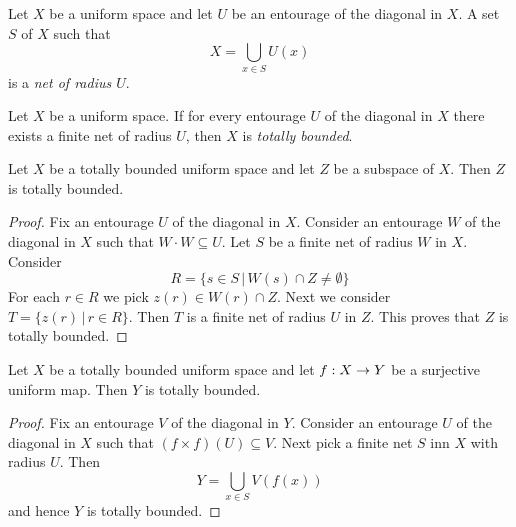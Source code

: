 \begin{definition}
	Let $X$ be a uniform space and let $U$ be an entourage of the diagonal in $X$. A set $S$ of $X$ such that
	$$X = \bigcup_{x\in S}U(x)$$
	is a \textit{net of radius $U$}.
\end{definition}

\begin{definition}
	Let $X$ be a uniform space. If for every entourage $U$ of the diagonal in $X$ there exists a finite net of radius $U$, then $X$ is \textit{totally bounded}.
\end{definition}

\begin{theorem}\label{theorem:totally_bounded_is_inherited_by_subspaces}
	Let $X$ be a totally bounded uniform space and let $Z$ be a subspace of $X$. Then $Z$ is totally bounded.
\end{theorem}
\begin{proof}
	Fix an entourage $U$ of the diagonal in $X$. Consider an entourage $W$ of the diagonal in $X$ such that $W\cdot W \subseteq U$. Let $S$ be a finite net of radius $W$ in $X$. Consider
	$$R = \big\{s \in S\,\big|\,W(s)\cap Z \neq \emptyset\big\}$$
	For each $r\in R$ we pick $z(r) \in W(r)\cap Z$. Next we consider $T = \{z(r)\,|\,r\in R\}$. Then $T$ is a finite net of radius $U$ in $Z$. This proves that $Z$ is totally bounded.
\end{proof}

\begin{theorem}\label{theorem:surjective_image_of_totally_bounded_space_is_totally_bounded}
	Let $X$ be a totally bounded uniform space and let $f:X\rightarrow Y$ be a surjective uniform map. Then $Y$ is totally bounded.
\end{theorem}
\begin{proof}
	Fix an entourage $V$ of the diagonal in $Y$. Consider an entourage $U$ of the diagonal in $X$ such that $\left(f\times f\right)\left(U\right) \subseteq V$. Next pick a finite net $S$ inn $X$ with radius $U$. Then
	$$Y = \bigcup_{x\in S}V\left(f(x)\right)$$
	and hence $Y$ is totally bounded.
\end{proof}

